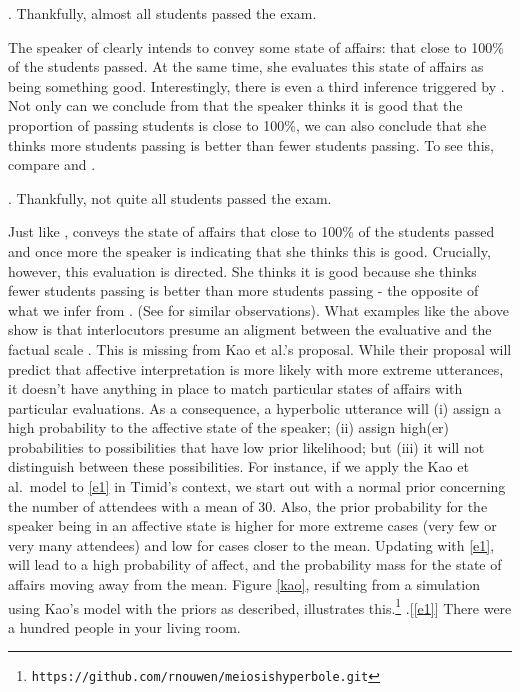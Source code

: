 \documentclass[a4paper,12pt,twoside]{article}
\begin{document}
\ex. Thankfully, almost all students passed the exam.

The speaker of \Last clearly intends to convey some state of affairs: that close to 100\% of the students passed. At the same time, she evaluates this state of affairs as being something good. Interestingly, there is even a third inference triggered by \Last. Not only can we conclude from \Last that the speaker thinks it is good that the proportion of passing students is close to 100\%, we can also conclude that she thinks more students passing is better than fewer students passing. To see this, compare \Last and \Next.

\ex. Thankfully, not quite all students passed the exam.

Just like \LLast, \Last conveys the state of affairs that close to 100\% of the students passed and once more the speaker is indicating that she thinks this is good. Crucially, however, this evaluation is directed. She thinks it is good because she thinks fewer students passing is better than more students passing - the opposite of what we infer from \LLast. (See \citealt{sanford02,nouwen:05,geurts:ac09} for similar observations). What examples like the above show is that interlocutors presume an aligment between the evaluative and the factual scale \citep{geurts:13}. This is missing from Kao et al.'s proposal. While their proposal will predict that affective interpretation is more likely with more extreme utterances, it doesn't have anything in place to match particular states of affairs with particular evaluations. As a consequence, a hyperbolic utterance will (i) assign a high probability to the affective state of the speaker; (ii) assign high(er) probabilities to possibilities that have low prior likelihood; but (iii) it will not distinguish between these possibilities. For instance, if we apply the Kao et al.~model to \ref{e1} in Timid's context, we start out with a normal prior concerning the number of attendees with a mean of 30. Also, the prior probability for the speaker being in an affective state is higher for more extreme cases (very few or very many attendees) and low for cases closer to the mean. Updating with \ref{e1}, will lead to a high probability of affect, and the probability mass for the state of affairs moving away from the mean. Figure \ref{kao}, resulting from a simulation using Kao's model with the priors as described, illustrates this.\footnote{{\tt https://github.com/rnouwen/meiosishyperbole.git}}
\ex.[\ref{e1}] There were a hundred people in your living room.
\end{document}
